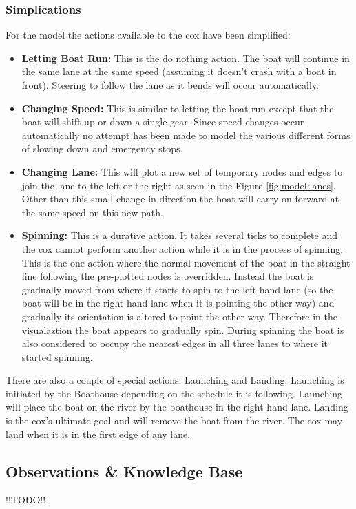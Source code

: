       \subsubsection{Simplications}
      For the model the actions available to the cox have been simplified:
      \begin{itemize}
        \item{\textbf{Letting Boat Run:}} This is the do nothing action. The boat will continue in the same lane at the same speed (assuming it doesn't crash with a boat in front). Steering to follow the lane as it bends will occur automatically.
        \item{\textbf{Changing Speed:}} This is similar to letting the boat run except that the boat will shift up or down a single gear. Since speed changes occur automatically no attempt has been made to model the various different forms of slowing down and emergency stops.
        \item{\textbf{Changing Lane:}} This will plot a new set of temporary nodes and edges to join the lane to the left or the right as seen in the Figure \ref{fig:model:lanes}. Other than this small change in direction the boat will carry on forward at the same speed on this new path.
        \item{\textbf{Spinning:}} This is a durative action. It takes several ticks to complete and the cox cannot perform another action while it is in the process of spinning. This is the one action where the normal movement of the boat in the straight line following the pre-plotted nodes  is overridden. Instead the boat is gradually moved from where it starts to spin to the left hand lane (so the boat will be in the right hand lane when it is pointing the other way) and gradually its orientation is altered to point the other way. Therefore in the visualaztion the boat appears to gradually spin. During spinning the boat is also considered to occupy the nearest edges in all three lanes to where it started spinning.
      \end{itemize}
      
      There are also a couple of special actions: Launching and Landing. Launching is initiated by the Boathouse depending on the schedule it is following. Launching will place the boat on the river by the boathouse in the right hand lane. Landing is the cox's ultimate goal and will remove the boat from the river. The cox may land when it is in the first edge of any lane.
      
      \subsection{Observations \& Knowledge Base} \label{model:cox:obs}
      !!TODO!!
